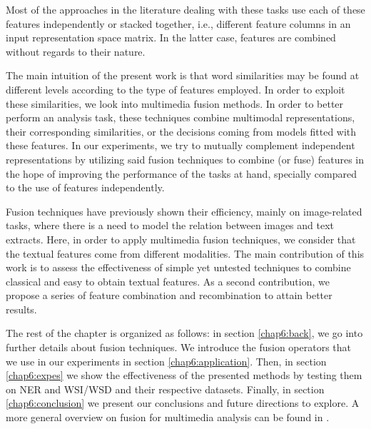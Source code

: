 Most of the approaches in the literature dealing with these tasks use each of these features independently or stacked together, i.e., different feature columns in an input representation space matrix. In the latter case, features are combined without regards to their nature. 

The main intuition of the present work is that word similarities may be found at different levels according to the type of features employed. In order to exploit these similarities, we look into multimedia fusion methods.  In order to better perform an analysis task, these techniques combine multimodal representations, their corresponding similarities, or the decisions coming from models fitted with these features. In our experiments, we try to mutually complement independent representations by utilizing said fusion techniques to combine (or fuse) features in the hope of improving the performance of the tasks at hand, specially compared to the use of features independently. 

Fusion techniques have previously shown their efficiency, mainly on image-related tasks, where there is a need to model the relation  between images and text extracts.
%
%
Here, in order to apply multimedia fusion techniques, we consider that the textual features  come from different modalities. The main contribution of this work is to assess the effectiveness of simple yet untested techniques to combine classical and easy to obtain textual features. As a second contribution, we propose a series of feature combination and recombination to attain better results. 

The rest of the chapter is organized as follows: in section \ref{chap6:back}, we go into further details about fusion techniques. 
We introduce the fusion operators that we use in our experiments in section \ref{chap6:application}. Then, in section \ref{chap6:expes} we show the effectiveness of the presented methods by testing them on NER and WSI/WSD and their respective datasets. Finally, in section \ref{chap6:conclusion} we present our conclusions and future directions to explore. A more general overview on fusion for multimedia analysis can be found in \cite{AtreyHEK10}.

